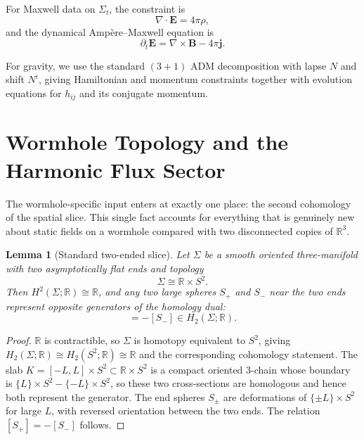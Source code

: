\documentclass[aps,prd,onecolumn,nofootinbib,superscriptaddress]{revtex4-2}
\newtheorem{lemma}{Lemma}
\begin{document}
For Maxwell data on $\Sigma_t$, the constraint is
\begin{equation}
\nabla \cdot \bm{E} = 4\pi \rho,
\end{equation}
and the dynamical Amp\`ere--Maxwell equation is
\begin{equation}
\label{eq:ampere}
\partial_t \bm{E} = \nabla \times \bm{B} - 4\pi \bm{j}.
\end{equation}

For gravity, we use the standard $(3+1)$ ADM decomposition with lapse $N$ and shift $N^i$, giving Hamiltonian and momentum constraints together with evolution equations for $h_{ij}$ and its conjugate momentum.\cite{ArnowittDeserMisner1962Dynamics,Wald1984GeneralRelativity}

\section{Wormhole Topology and the Harmonic Flux Sector}
\label{sec:topology}

The wormhole-specific input enters at exactly one place: the second cohomology of the spatial slice. This single fact accounts for everything that is genuinely new about static fields on a wormhole compared with two disconnected copies of $\mathbb{R}^3$.

\begin{lemma}[Standard two-ended slice]
\label{lem:standard-topology}
Let $\Sigma$ be a smooth oriented three-manifold with two asymptotically flat ends and topology
\begin{equation}
\Sigma \cong \mathbb{R}\times S^2.
\end{equation}
Then $H^2(\Sigma;\mathbb{R}) \cong \mathbb{R}$, and any two large spheres $S_+$ and $S_-$ near the two ends represent opposite generators of the homology dual:
\begin{equation}
[S_+] = -[S_-] \in H_2(\Sigma;\mathbb{R}).
\end{equation}
\end{lemma}

\begin{proof}
$\mathbb{R}$ is contractible, so $\Sigma$ is homotopy equivalent to $S^2$, giving $H_2(\Sigma;\mathbb{R}) \cong H_2(S^2;\mathbb{R}) \cong \mathbb{R}$ and the corresponding cohomology statement. The slab $K = [-L,L]\times S^2 \subset \mathbb{R}\times S^2$ is a compact oriented 3-chain whose boundary is $\{L\}\times S^2 - \{-L\}\times S^2$, so these two cross-sections are homologous and hence both represent the generator. The end spheres $S_\pm$ are deformations of $\{\pm L\}\times S^2$ for large $L$, with reversed orientation between the two ends. The relation $[S_+] = -[S_-]$ follows.
\end{proof}
\end{document}

